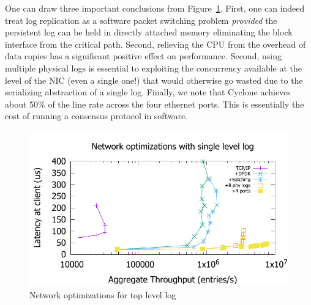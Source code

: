 \documentclass[letterpaper,twocolumn,10pt]{article}
\begin{document}
One can draw three important conclusions from
Figure~\ref{fig:network_opts}. First, one can indeed treat log replication as a
software packet switching problem \emph{provided} the persistent log can be held
in directly attached memory eliminating the block interface from the critical
path. Second, relieving the CPU from the overhead of data copies has a
significant positive effect on performance. Second, using multiple physical
logs is essential to exploiting the concurrency available at the level of the
NIC (even a single one!) that would otherwise go wasted due
to the serializing abstraction of a single log. Finally, we note that Cyclone
achieves about 50\% of the line rate across the four ethernet
ports. This is essentially the cost of running a consensus protocol in
software.

\begin{figure}
\includegraphics[scale=0.6]{results2/network_opts.pdf}
\caption{Network optimizations for top level log}
\label{fig:network_opts}
\end{figure}
\end{document}
